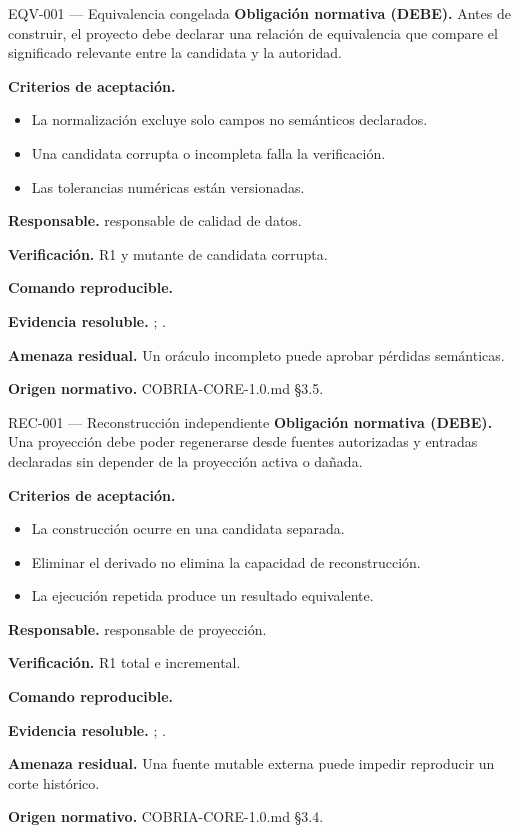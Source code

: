 \begin{requisito}{EQV-001 --- Equivalencia congelada}
\textbf{Obligación normativa (DEBE).} Antes de construir, el proyecto debe declarar una relación de equivalencia que compare el significado relevante entre la candidata y la autoridad.\par
\textbf{Criterios de aceptación.}
\begin{itemize}
\item La normalización excluye solo campos no semánticos declarados.
\item Una candidata corrupta o incompleta falla la verificación.
\item Las tolerancias numéricas están versionadas.
\end{itemize}
\textbf{Responsable.} responsable de calidad de datos.\par
\textbf{Verificación.} R1 y mutante de candidata corrupta.\par
\textbf{Comando reproducible.} \texttt{}\par
\textbf{Evidencia resoluble.} ; .\par
\textbf{Amenaza residual.} Un oráculo incompleto puede aprobar pérdidas semánticas.\par
\textbf{Origen normativo.} COBRIA-CORE-1.0.md §3.5.
\end{requisito}
\begin{requisito}{REC-001 --- Reconstrucción independiente}
\textbf{Obligación normativa (DEBE).} Una proyección debe poder regenerarse desde fuentes autorizadas y entradas declaradas sin depender de la proyección activa o dañada.\par
\textbf{Criterios de aceptación.}
\begin{itemize}
\item La construcción ocurre en una candidata separada.
\item Eliminar el derivado no elimina la capacidad de reconstrucción.
\item La ejecución repetida produce un resultado equivalente.
\end{itemize}
\textbf{Responsable.} responsable de proyección.\par
\textbf{Verificación.} R1 total e incremental.\par
\textbf{Comando reproducible.} \texttt{}\par
\textbf{Evidencia resoluble.} ; .\par
\textbf{Amenaza residual.} Una fuente mutable externa puede impedir reproducir un corte histórico.\par
\textbf{Origen normativo.} COBRIA-CORE-1.0.md §3.4.
\end{requisito}
